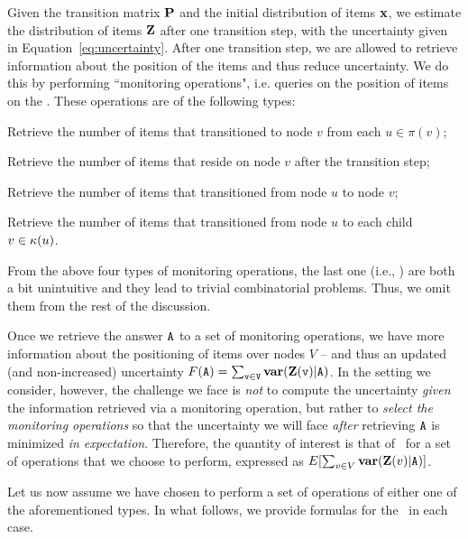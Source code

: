 Given the transition matrix $\mathbf{P}$ and the 
initial distribution of
items $\mathbf{x}$, we estimate the distribution of items 
$\mathbf{Z}$ after
one transition step, with
the uncertainty given in Equation~\eqref{eq:uncertainty}.
After one transition step,
we are allowed to 
retrieve information about the position of the items
and thus reduce uncertainty.
We do this by performing ``monitoring operations", i.e. queries on the
position of items on the \markovchain.
These operations are  of the following types:
\squishlist
	\item{\bf \parentstransitions} Retrieve the number of items that transitioned 
  to node $v$ from each  $u\in\pi(v)$;
  \item{\bf \nodeitems} Retrieve the number of items that reside on node 
  $v$ after the transition step;
	\item{\bf \edgetransitions} Retrieve the number of items that transitioned 
  from node $u$ to node $v$;
	\item{\bf \childrentransitions} Retrieve the number of items that 
  transitioned from node $u$ to each child $v\in \kappa(u)$.
\squishend

From the above four types of monitoring operations, the last one (i.e., {\childrentransitions}) are both a bit 
unintuitive and they lead to trivial combinatorial problems. Thus, we omit them from the rest of the discussion.

Once we retrieve the answer $\tt A$ to a set of monitoring operations,
we have more information about the positioning of items over nodes $V$ 
-- and thus an updated (and non-increased) uncertainty 
$F(\tt A) = \sum_{v\in V}{\mathbf{var}(\mathbf{Z}(v) | \tt A)}$.
In the setting we consider, however, the challenge we face is {\it not} to compute
the uncertainty {\it given} the information retrieved via a monitoring 
operation, but rather to {\it select the monitoring operations} 
so that the uncertainty we will face {\it after} retrieving $\tt A$ is
minimized {\it in expectation}. Therefore, the quantity of interest
is that of \expecteduncertainty\ for a set of operations
that we choose to perform, expressed as 
$E[\sum_{v\in V}{\mathbf{var}(\mathbf{Z}(v) | \tt A)}]$. %

Let us now assume we have chosen to perform a set of operations of 
either one of the aforementioned types. In what follows, we provide 
formulas for the \expecteduncertainty\
in each case.


